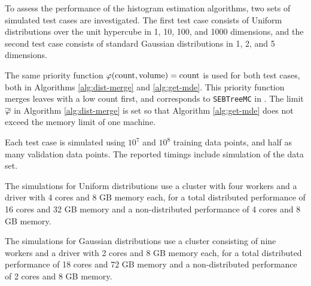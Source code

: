 \documentclass[../scalable-hists.tex]{subfiles}
\begin{document}
  

  To assess the performance of the histogram estimation algorithms,
  two sets of simulated test cases are investigated.
  The first test case consists of Uniform distributions over the unit hypercube in 
  1, 10, 100, and 1000 dimensions,
  and the second test case consists of standard Gaussian distributions in 1, 2, and 5 dimensions.

  The same priority function $\varphi(\mathrm{count}, \mathrm{volume}) = \mathrm{count}$ is used for both test cases,
  both in Algorithms \ref{alg:dist-merge} and \ref{alg:get-mde}.
  This priority function merges leaves with a low count first,
  and corresponds to \verb|SEBTreeMC| in \cite{srp-mde-raaz-teng}.
  The limit $\overline {\varphi}$ in Algorithm \ref{alg:dist-merge}
  is set so that Algorithm \ref{alg:get-mde} does not exceed the memory limit of one machine.

  Each test case is simulated using $10^7$ and $10^8$ training data points,
  and half as many validation data points.
  The reported timings include simulation of the data set.

  The simulations for Uniform distributions use a cluster with
  four workers and a driver with 4 cores and 8 GB memory each,
  for a total distributed performance of 16 cores and 32 GB memory and
  a non-distributed performance of 4 cores and 8 GB memory.

  The simulations for Gaussian distributions use a cluster consisting of 
  nine workers and a driver with 2 cores and 8 GB memory each,
  for a total distributed performance of 18 cores and 72 GB memory and
  a non-distributed performance of 2 cores and 8 GB memory.
\end{document}
